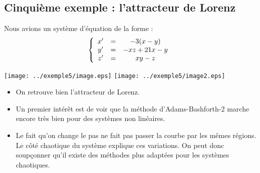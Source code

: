 \subsection{Cinquième exemple : l'attracteur de Lorenz}

Nous avions un système d'équation de la forme :
\[\left\{ \begin{array}{c c c}
x' &=& -3(x-y)\\
y' &=& -xz + 21x - y\\
z' &=& xy - z
\end{array}\right.\]

\begin{center}
\texttt{[image: ../exemple5/image.eps]}
\texttt{[image: ../exemple5/image2.eps]}

\begin{itemize}
	\item On retrouve bien l'attracteur de Lorenz.
	\item Un premier intérêt est de voir que la méthode d'Adams-Bashforth-2 marche encore très bien pour des systèmes non linéaires.
	\item Le fait qu'on change le pas ne fait pas passer la courbe par les mêmes régions. Le côté chaotique du système explique ces variations. On peut donc soupçonner qu'il existe des méthodes plus adaptées pour les systèmes chaotiques.
\end{itemize}
\end{center}
